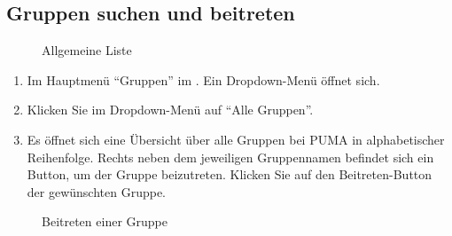 \subsection{Gruppen suchen und beitreten}
\label{subsec:gruppenSuchenBeitreten}

\begin{figure}[h!]
 \centering
 \caption{Allgemeine Liste}
 \label{fig:allgemeineListe}
\end{figure}
\begin{enumerate}

\item Im Hauptmenü \enquote{Gruppen} im . Ein Dropdown-Menü öffnet sich.
    \item Klicken Sie im Dropdown-Menü auf \enquote{Alle Gruppen}.
    \item Es öffnet sich eine Übersicht über alle Gruppen bei PUMA in alphabetischer Reihenfolge. Rechts neben dem jeweiligen Gruppennamen befindet sich ein Button, um der Gruppe beizutreten. Klicken Sie auf den Beitreten-Button der gewünschten Gruppe.
		\end{enumerate}
\begin{figure}[h!]
 \centering
 \caption{Beitreten einer Gruppe}
 \label{fig:gruppeBeitreten}
\end{figure}
